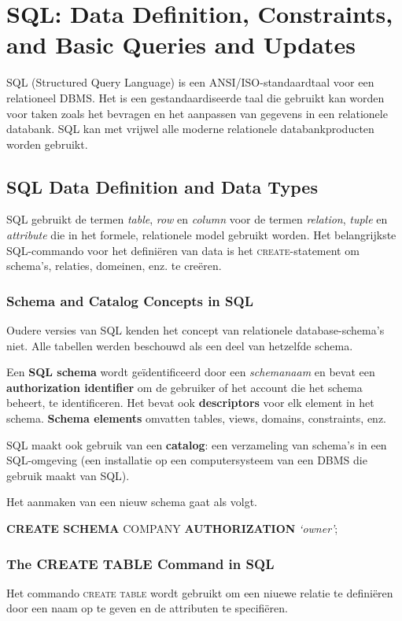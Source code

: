 \chapter{SQL: Data Definition, Constraints, and Basic Queries and Updates}
SQL (Structured Query Language) is een ANSI/ISO-standaardtaal voor een relationeel DBMS. Het is een gestandaardiseerde taal die gebruikt kan worden voor taken zoals het bevragen en het aanpassen van gegevens in een relationele databank. SQL kan met vrijwel alle moderne relationele databankproducten worden gebruikt. 



\section{SQL Data Definition and Data Types}
SQL gebruikt de termen \textit{table}, \textit{row} en \textit{column} voor de termen \textit{relation}, \textit{tuple} en \textit{attribute} die in het formele, relationele model gebruikt worden. Het belangrijkste SQL-commando voor het defini\"eren van data is het \textsc{create}-statement om schema's, relaties, domeinen, enz. te cre\"eren.


\subsection{Schema and Catalog Concepts in SQL}
Oudere versies van SQL kenden het concept van relationele database-schema's niet. Alle tabellen werden beschouwd als een deel van hetzelfde schema.

Een \textbf{SQL schema} wordt ge\"identificeerd door een \textit{schemanaam} en bevat een \textbf{authorization identifier} om de gebruiker of het account die het schema beheert, te identificeren. Het bevat ook \textbf{descriptors} voor elk element in het schema. \textbf{Schema elements} omvatten tables, views, domains, constraints, enz.

SQL maakt ook gebruik van een \textbf{catalog}: een verzameling van schema's in een SQL-omgeving (een installatie op een computersysteem van een DBMS die gebruik maakt van SQL).

Het aanmaken van een nieuw schema gaat als volgt.

\vspace{1mm}\hspace{10mm}
\textbf{CREATE SCHEMA} COMPANY \textbf{AUTHORIZATION} \textit{`owner'};


\subsection{The CREATE TABLE Command in SQL }
Het commando \textsc{create table} wordt gebruikt om een niuewe relatie te defini\"eren door een naam op te geven en de attributen te specifi\"eren.

